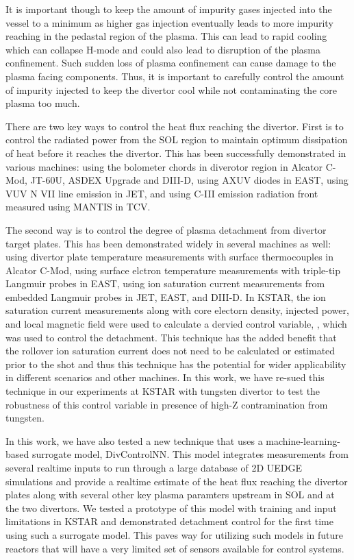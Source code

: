 It is important though to keep the amount of impurity gases injected into the vessel to a minimum as higher gas injection eventually leads to more impurity reaching in the pedastal region of the plasma.
This can lead to rapid cooling which can collapse H-mode and could also lead to disruption of the plasma confinement.
Such sudden loss of plasma confinement can cause damage to the plasma facing components.
Thus, it is important to carefully control the amount of impurity injected to keep the divertor cool while not contaminating the core plasma too much.

There are two key ways to control the heat flux reaching the divertor.
First is to control the radiated power from the \ac{SOL} region to maintain optimum dissipation of heat before it reaches the divertor.
This has been successfully demonstrated in various machines:
using the bolometer chords in diverotor region in Alcator C-Mod\cite{Goetz_1999_POP}, JT-60U\cite{Asakura_2009_NF}, ASDEX Upgrade\cite{Kallenbach_2012_NF} and DIII-D\cite{Eldon_2019_NME},
using AXUV diodes in EAST\cite{Wu_2018_NF},
using VUV N VII line emission in JET\cite{Maddison_2011_NF}, and
using C-III emission radiation front measured using MANTIS in TCV\cite{Ravensbergen_2021_NC}.

The second way is to control the degree of plasma detachment from divertor target plates.
This has been demonstrated widely in several machines as well:
using divertor plate temperature measurements with surface thermocouples in Alcator C-Mod\cite{Brunner_2017_NF},
using surface elctron temperature measurements with triple-tip Langmuir probes in EAST\cite{Eldon_2021_NME},
using ion saturation current measurements from embedded Langmuir probes in JET\cite{Guillemaut_2017_PPCF}, EAST\cite{Yuan_2020_FED}, and DIII-D\cite{Eldon_2021_NME}.
In KSTAR, the ion saturation current measurements along with core electorn density, injected power, and local magnetic field were used to calculate a dervied control variable, \Afrac, which was used to control the detachment\cite{Eldon_2022_PPCF}.
This technique has the added benefit that the rollover ion saturation current does not need to be calculated or estimated prior to the shot and thus this technique has the potential for wider applicability in different scenarios and other machines.
In this work, we have re-sued this technique in our experiments at KSTAR with tungsten divertor to test the robustness of this control variable in presence of high-Z contramination from tungsten.

In this work, we have also tested a new technique that uses a machine-learning-based surrogate model, DivControlNN\cite{Zhu_2025_InPrep}.
This model integrates measurements from several realtime inputs to run through a large database of 2D UEDGE simulations and provide a realtime estimate of the heat flux reaching the divertor plates along with several other key plasma paramters upstream in \ac{SOL} and at the two divertors.
We tested a prototype of this model with training and input limitations in KSTAR and demonstrated detachment control for the first time using such a surrogate model.
This paves way for utilizing such models in future reactors that will have a very limited set of sensors available for control systems.

